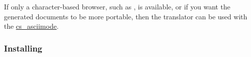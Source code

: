 %
%
\html{\\}%

If only a character-based browser, such as , is available, 
or if you want the generated documents to be more portable, 
then the translator can be used with the  
\hyperref{option}{option (see Section~}{)}{cs_asciimode}. 



\subsubsection{Installing \protect\latextohtml}%
\html{\\}%
